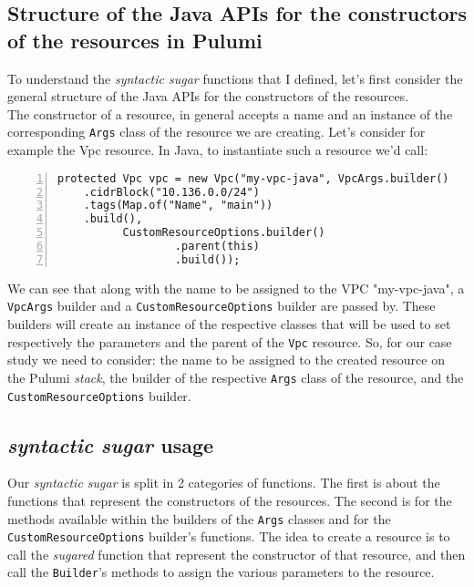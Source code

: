 \subsection{Structure of the Java APIs for the constructors of the resources in Pulumi}
To understand the \textit{syntactic sugar} functions that I defined, let's first consider the general structure of the Java APIs for the constructors of the resources.\\
The constructor of a resource, in general accepts a name and an instance of the corresponding \texttt{Args} class of the resource we are creating.
Let's consider for example the Vpc resource.
In Java, to instantiate such a resource we'd call:\\
\begin{minipage}{\linewidth}
\begin{lstlisting}[numbers=left, numberstyle=\tiny, numbersep=-5pt, stepnumber=1]
  protected Vpc vpc = new Vpc("my-vpc-java", VpcArgs.builder()
    .cidrBlock("10.136.0.0/24")
    .tags(Map.of("Name", "main"))
    .build(),
          CustomResourceOptions.builder()
                  .parent(this)
                  .build());
\end{lstlisting}
\end{minipage}
We can see that along with the name to be assigned to the VPC "my-vpc-java", a \texttt{VpcArgs} builder and a \texttt{CustomResourceOptions} builder are passed by.
These builders will create an instance of the respective classes that will be used to set respectively the parameters and the parent of the \texttt{Vpc} resource.
So, for our case study we need to consider: the name to be assigned to the created resource on the Pulumi \textit{stack}, the builder of the respective \texttt{Args} class of the resource, and the \texttt{CustomResourceOptions} builder.


\subsection{\textit{syntactic sugar} usage}
\label{ssec:syn-sug-usage}
Our \textit{syntactic sugar} is split in 2 categories of functions.
The first is about the functions that represent the constructors of the resources.
The second is for the methods available within the builders of the \texttt{Args} classes and for the \texttt{CustomResourceOptions} builder's functions.
The idea to create a resource is to call the \textit{sugared} function that represent the constructor of that resource, and then call the \texttt{Builder}'s methods to assign the various parameters to the resource.

